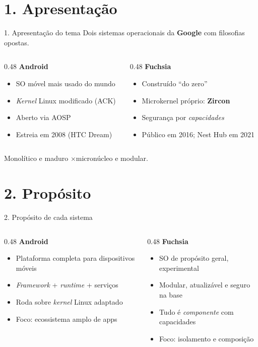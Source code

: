 \documentclass[aspectratio=169,11pt]{beamer}
\newcommand{\ANDROID}{\textbf{\color{androidVerde}Android}}
\newcommand{\FUCHSIA}{\textbf{\color{fuchsiaCor}Fuchsia}}
\newcommand{\comparar}[2]{%
  \begin{columns}[T,onlytextwidth]
    \begin{column}{0.48\textwidth}
      \ANDROID\par\smallskip
      \begin{itemize}\footnotesize #1 \end{itemize}
    \end{column}
    \begin{column}{0.48\textwidth}
      \FUCHSIA\par\smallskip
      \begin{itemize}\footnotesize #2 \end{itemize}
    \end{column}
  \end{columns}%
}
\begin{document}
\section{1. Apresentação}

\begin{frame}{1. Apresentação do tema}
  Dois sistemas operacionais da \textbf{Google} com filosofias opostas.
  \vfill
  \comparar{
    \item SO móvel mais usado do mundo
    \item \emph{Kernel} Linux modificado (ACK)
    \item Aberto via AOSP
    \item Estreia em 2008 (HTC Dream)
  }{
    \item Construído ``do zero''
    \item Microkernel próprio: \textbf{Zircon}
    \item Segurança por \emph{capacidades}
    \item Público em 2016; Nest Hub em 2021
  }
  \vfill
  \begin{center}\small
    Monolítico e maduro \quad$\times$\quad micronúcleo e modular.
  \end{center}
\end{frame}

\section{2. Propósito}

\begin{frame}{2. Propósito de cada sistema}
  \comparar{
    \item Plataforma completa para dispositivos móveis
    \item \emph{Framework} + \emph{runtime} + serviços
    \item Roda sobre \emph{kernel} Linux adaptado
    \item Foco: ecossistema amplo de apps
  }{
    \item SO de propósito geral, experimental
    \item Modular, atualizável e seguro na base
    \item Tudo é \emph{componente} com capacidades
    \item Foco: isolamento e composição
  }
\end{frame}
\end{document}
